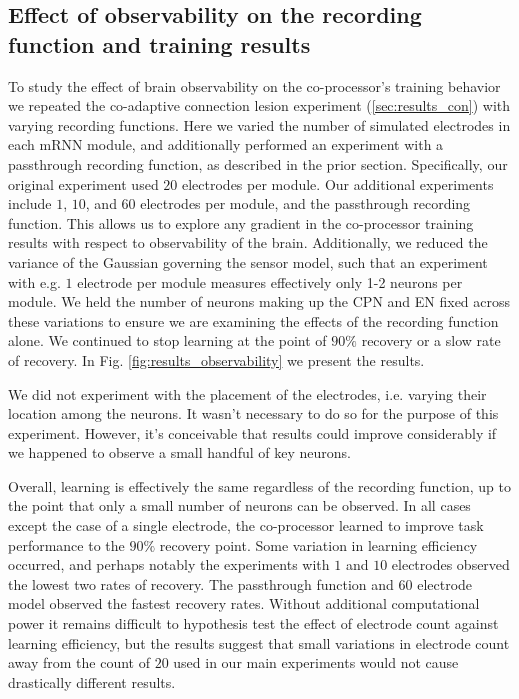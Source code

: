 \documentclass[12pt]{iopart}
\begin{document}
\subsection{Effect of observability on the recording function and training results}
\label{sup:observability}

To study the effect of brain observability on the co-processor's training behavior
we repeated the co-adaptive connection lesion experiment (\ref{sec:results_con})
with varying recording functions. Here we varied the number of simulated electrodes
in each mRNN module, and additionally performed an experiment with a passthrough recording
function, as described in the prior section. Specifically, our original experiment used
$20$ electrodes per module. Our additional experiments include $1$, $10$, and $60$ electrodes
per module, and the passthrough recording function. This allows us to explore any
gradient in the co-processor training results with respect to observability of the 
brain. Additionally, we reduced the variance of the Gaussian governing
the sensor model, such that an experiment with e.g. $1$ electrode per
module measures effectively only 1-2 neurons per module. We held the number of
neurons making up the CPN and EN fixed across these variations to ensure we
are examining the effects of the recording function alone. We continued to stop
learning at the point of $90\%$ recovery or a slow rate of recovery. In Fig.
\ref{fig:results_observability} we present the results.

We did not experiment with the placement of the electrodes, i.e. varying their
location among the neurons. It wasn't necessary to do so for the purpose of this
experiment. However, it's conceivable that results could improve considerably if we
happened to observe a small handful of key neurons.

Overall, learning is effectively the same regardless of the recording 
function, up to the point that only a small number of neurons can be 
observed. In all cases except the case of a single electrode, the co-processor
learned to improve task performance to the $90\%$ recovery point. Some variation
in learning efficiency occurred, and perhaps notably the experiments with $1$ and
$10$ electrodes observed the lowest two rates of recovery. The passthrough 
function and $60$ electrode model observed the fastest recovery rates.
Without additional computational power it remains difficult to hypothesis
test the effect of electrode count against learning efficiency, but the
results suggest that small variations in electrode count away from the
count of $20$ used in our main experiments would not cause drastically
different results.
\end{document}
